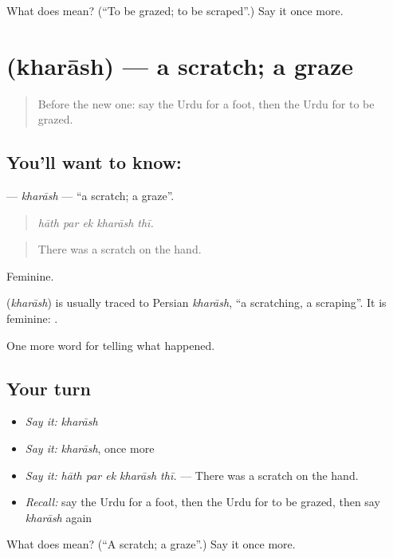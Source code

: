 \begin{tcolorbox}[breakable,colback=teal!4,colframe=teal!35!black,title={Before you move on}]
What does  mean? (\textquotedblleft{}To be grazed; to be scraped\textquotedblright{}.) Say it once more.
\end{tcolorbox}
\section[\texorpdfstring{\ur{خراش} (kharāsh)}{خراش (kharāsh)}]{ (kharāsh) — a scratch; a graze}

\label{lesson:UR-C285-kharash}



\begin{quote}
Before the new one: say the Urdu for a foot, then the Urdu for to be grazed.
\end{quote}

\subsection*{You'll want to know: }
\textbf{} — \emph{kharāsh} — \textquotedblleft{}a scratch; a graze\textquotedblright{}.

\begin{quote}
    
\end{quote}

\begin{quote}
\emph{hāth par ek kharāsh thī.}
\end{quote}

\begin{quote}
There was a scratch on the hand.
\end{quote}

Feminine.

\begin{cousinweb}
\textbf{} (\emph{kharāsh}) is usually traced to Persian \emph{kharāsh}, \textquotedblleft{}a scratching, a scraping\textquotedblright{}. It is feminine: \textbf{  }.
\end{cousinweb}

\begin{grammarlens}[title={What you've built}]
One more word for telling what happened.
\end{grammarlens}

\subsection*{Your turn}
\begin{itemize}
\raggedright
  \item \emph{Say it:} \emph{kharāsh}
  \item \emph{Say it:} \emph{kharāsh}, once more
  \item \emph{Say it:} \emph{hāth par ek kharāsh thī.} — There was a scratch on the hand.
  \item \emph{Recall:} say the Urdu for a foot, then the Urdu for to be grazed, then say \emph{kharāsh} again
\end{itemize}

\begin{tcolorbox}[breakable,colback=teal!4,colframe=teal!35!black,title={Before you move on}]
What does  mean? (\textquotedblleft{}A scratch; a graze\textquotedblright{}.) Say it once more.
\end{tcolorbox}
